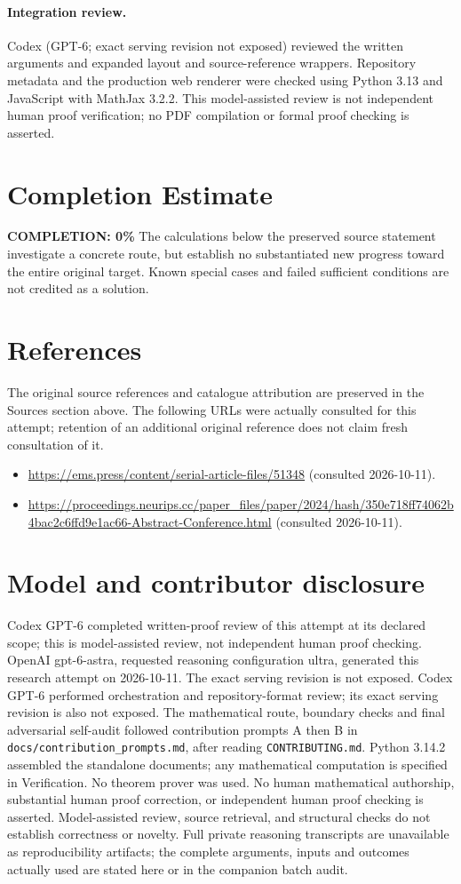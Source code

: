 \documentclass[11pt]{article}
\begin{document}
\paragraph{Integration review.} Codex (GPT-6; exact serving revision not exposed) reviewed the written arguments and expanded layout and source-reference wrappers. Repository metadata and the production web renderer were checked using Python 3.13 and JavaScript with MathJax 3.2.2. This model-assisted review is not independent human proof verification; no PDF compilation or formal proof checking is asserted.

\section{Completion Estimate}
\noindent\textbf{COMPLETION: 0\%}
The calculations below the preserved source statement investigate a concrete route,
but establish no substantiated new progress toward the entire original target.
Known special cases and failed sufficient conditions are not credited as a solution.
\section{References}
The original source references and catalogue attribution are preserved in the
Sources section above. The following URLs were actually consulted for this attempt;
retention of an additional original reference does not claim fresh consultation of it.
\begin{itemize}
\item \url{https://ems.press/content/serial-article-files/51348} (consulted 2026-10-11). 
\item \url{https://proceedings.neurips.cc/paper_files/paper/2024/hash/350e718ff74062b4bac2c6ffd9e1ac66-Abstract-Conference.html} (consulted 2026-10-11). 
\end{itemize}
\section{Model and contributor disclosure}
Codex GPT-6 completed written-proof review of this attempt at its declared scope; this is model-assisted review, not independent human proof checking.
OpenAI gpt-6-astra, requested reasoning configuration ultra, generated this research
attempt on 2026-10-11. The exact serving revision is not exposed. Codex GPT-6
performed orchestration and repository-format review; its exact serving revision
is also not exposed. The mathematical route, boundary checks and final adversarial
self-audit followed contribution prompts A then B in
\texttt{docs/contribution\_prompts.md}, after reading \texttt{CONTRIBUTING.md}.
Python 3.14.2 assembled the standalone documents; any mathematical computation is
specified in Verification. No theorem prover was used. No human mathematical
authorship, substantial human proof correction, or independent human proof checking
is asserted. Model-assisted review, source retrieval, and structural checks do not
establish correctness or novelty. Full private reasoning transcripts are unavailable
as reproducibility artifacts; the complete arguments, inputs and outcomes actually
used are stated here or in the companion batch audit.
\end{document}

